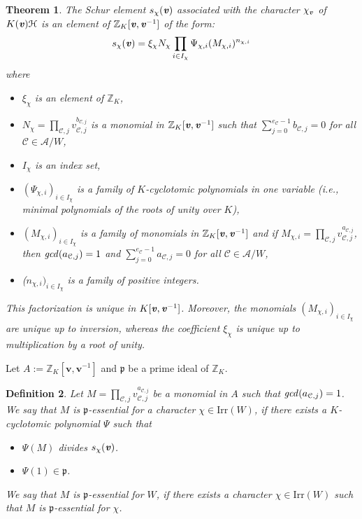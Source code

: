 \documentclass[10pt,a4paper,titlepage]{article}
\newtheorem{theorem}{Theorem}[section]
\newtheorem{definition}[theorem]{Definition}
\begin{document}
\begin{theorem}\label{Schur element generic}
The Schur element $s_\chi(\textbf{\emph{v}})$ associated with the
character $\chi_{\textbf{\emph{v}}}$ of
$K(\textbf{\emph{v}})\mathcal{H}$ is an element of
$\mathbb{Z}_K[\textbf{\emph{v}},\textbf{\emph{v}}^{-1}]$ of the form:
$$s_\chi({\textbf{\emph{v}}})=\xi_\chi N_\chi \prod_{i \in I_\chi} \Psi_{\chi,i}(M_{\chi,i})^{n_{\chi,i}}$$
where
\begin{itemize}
    \item $\xi_\chi$ is an element of $\mathbb{Z}_K$,
    \item $N_\chi= \prod_{\mathcal{C},j} v_{\mathcal{C},j}^{b_{\mathcal{C},j}}$ is a monomial in $\mathbb{Z}_K[\textbf{\emph{v}},\textbf{\emph{v}}^{-1}]$
          such that $\sum_{j=0}^{e_\mathcal{C}-1}b_{\mathcal{C},j}=0$
          for all $\mathcal{C} \in \mathcal{A}/W$,
    \item $I_\chi$ is an index set,
    \item $(\Psi_{\chi,i})_{i \in I_\chi}$ is a family of $K$-cyclotomic polynomials in one variable
           (i.e., minimal polynomials of the roots of unity over $K$),
    \item $(M_{\chi,i})_{i \in I_\chi}$ is a family of monomials in $\mathbb{Z}_K[\textbf{\emph{v}},\textbf{\emph{v}}^{-1}]$
          and if $M_{\chi,i} = \prod_{\mathcal{C},j} v_{\mathcal{C},j}^{a_{\mathcal{C},j}}$,
          then $\textrm{\emph{gcd}}(a_{\mathcal{C},j})=1$
          and $\sum_{j=0}^{e_\mathcal{C}-1}a_{\mathcal{C},j}=0$
          for all $\mathcal{C} \in \mathcal{A}/W$,
    \item ($n_{\chi,i})_{i \in I_\chi}$ is a family of positive integers.
\end{itemize}
This factorization is unique in $K[\textbf{\emph{v}},\textbf{\emph{v}}^{-1}]$. Moreover, the monomials
 $(M_{\chi,i})_{i \in I_\chi}$ are unique up to inversion, whereas the coefficient $\xi_\chi$ is unique up to multiplication by a root of unity.
\end{theorem}

Let $A:=\mathbb{Z}_K[\textbf{v},\textbf{v}^{-1}]$ and $\mathfrak{p}$ be a prime ideal of $\mathbb{Z}_K$. 

\begin{definition}\label{p-essential monomial}
Let  $M = \prod_{\mathcal{C},j} v_{\mathcal{C},j}^{a_{\mathcal{C},j}}$ be a monomial in $A$
such that $\textrm{\emph{gcd}}(a_{\mathcal{C},j})=1$. We say that $M$ is $\mathfrak{p}$-essential
for a character $\chi \in \mathrm{Irr}(W)$, if there exists a $K$-cyclotomic polynomial $\Psi$ such that
\begin{itemize}
\item $\Psi(M)$ divides $s_\chi(\textbf{\emph{v}})$.
\item $\Psi(1)  \in  \mathfrak{p}$.
\end{itemize}
We say that $M$ is $\mathfrak{p}$-essential 
for $W$, if there exists a character $\chi \in \mathrm{Irr}(W)$ such that
$M$ is $\mathfrak{p}$-essential for $\chi$.
\end{definition}
\end{document}
